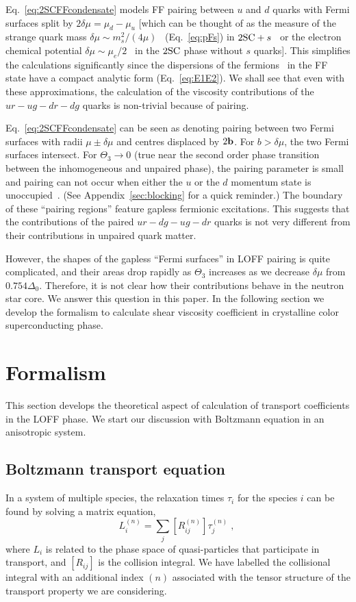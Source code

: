 \documentclass[10pt, aps, prd, superscriptaddress, nofootinbib, 
               amsmath, amssymb, twocolumn,
               preprintnumbers, showpacs,
               raggedbottom,
               floatfix]{revtex4-1}
\newcommand{\bfb}{{\bf{b}}}
\newcommand{\SC}{{\rm{SC}}}
\begin{document}
Eq.~\ref{eq:2SCFFcondensate} models FF pairing between $u$ and $d$ quarks with
Fermi surfaces split by $2\delta\mu=\mu_d-\mu_u$ [which can be thought of as
the measure of the strange quark mass $\delta\mu\sim
m_s^2/(4\mu)$~\cite{Alford:1999pa} (Eq.~\ref{eq:pFs}) in
$2\SC+s$~\cite{Alford:2007xm} or the electron chemical potential $\delta\mu\sim
\mu_e/2$~\cite{Shovkovy:2003uu} in the $2\SC$ phase without $s$ quarks]. This
simplifies the calculations significantly since the dispersions of the
fermions~\cite{Alford:2000ze} in the FF state have a compact analytic form
(Eq.~\ref{eq:E1E2}). We shall see that even with these approximations, the
calculation of the viscosity contributions of the $ur-ug-dr-dg$ quarks is
non-trivial because of pairing.

Eq.~\ref{eq:2SCFFcondensate} can be seen as denoting pairing between two Fermi
surfaces with radii $\mu\pm\delta\mu$ and centres displaced by $2\bfb$.
For $b>\delta\mu$, the two Fermi surfaces intersect. For $\Theta_3\rightarrow 0$
(true near the second order phase transition between the inhomogeneous
and unpaired phase), the pairing parameter is small and pairing can not occur when
either the $u$ or the $d$ momentum state is unoccupied~\cite{Alford:2000ze}. (See
Appendix~\ref{sec:blocking} for a quick reminder.) The boundary of these
``pairing regions'' feature gapless fermionic excitations. This suggests that
the contributions of the paired $ur-dg-ug-dr$ quarks is not very different from
their contributions in unpaired quark matter. 

However, the shapes of the gapless ``Fermi surfaces'' in LOFF pairing is quite
complicated, and their areas drop rapidly as $\Theta_3$ increases as we
decrease $\delta\mu$ from $0.754\Delta_{0}$. Therefore, it is not clear how
their contributions behave in the neutron star core. We answer this question in
this paper. In the following section we develop the formalism to calculate
shear viscosity coefficient in crystalline color superconducting phase.
 
\section{Formalism}
\label{formalism}
This section develops the theoretical aspect of calculation of transport
coefficients in the LOFF phase. We start our discussion with Boltzmann equation
in an anisotropic system.

\subsection{Boltzmann transport equation}
\label{sec:Boltzmann}
In a system of multiple species, the relaxation times $\tau_i$ for the species
$i$ can be found by solving a matrix equation,
\begin{equation}
L_i^{(n)}=\sum_j [R^{(n)}_{ij}]\tau^{(n)}_j\;,~\label{eq:matrix}
\end{equation}
where $L_i$ is related to the phase space of quasi-particles that participate
in transport, and $[R_{ij}]$ is the collision integral. We have labelled the
collisional integral with an additional index $(n)$ associated with the tensor
structure of the transport property we are considering.
\end{document}
